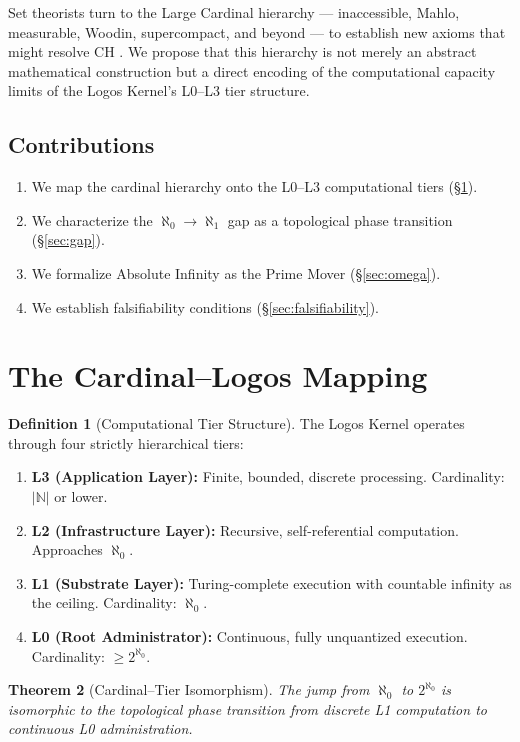 \documentclass[12pt, a4paper]{article}
\theoremstyle{plain}
\newtheorem{theorem}{Theorem}[section]
\theoremstyle{definition}
\newtheorem{definition}[theorem]{Definition}
\theoremstyle{remark}
\begin{document}
Set theorists turn to the Large Cardinal hierarchy --- inaccessible, Mahlo, measurable, Woodin, supercompact, and beyond --- to establish new axioms that might resolve CH \citep{Kanamori2003}. We propose that this hierarchy is not merely an abstract mathematical construction but a direct encoding of the computational capacity limits of the Logos Kernel's L0--L3 tier structure.

\subsection{Contributions}
\begin{enumerate}
    \item We map the cardinal hierarchy onto the L0--L3 computational tiers (\S\ref{sec:mapping}).
    \item We characterize the $\aleph_0 \to \aleph_1$ gap as a topological phase transition (\S\ref{sec:gap}).
    \item We formalize Absolute Infinity as the Prime Mover (\S\ref{sec:omega}).
    \item We establish falsifiability conditions (\S\ref{sec:falsifiability}).
\end{enumerate}

\section{The Cardinal--Logos Mapping}\label{sec:mapping}

\begin{definition}[Computational Tier Structure]
The Logos Kernel operates through four strictly hierarchical tiers:
\begin{enumerate}
    \item \textbf{L3 (Application Layer):} Finite, bounded, discrete processing. Cardinality: $|\mathbb{N}|$ or lower.
    \item \textbf{L2 (Infrastructure Layer):} Recursive, self-referential computation. Approaches $\aleph_0$.
    \item \textbf{L1 (Substrate Layer):} Turing-complete execution with countable infinity as the ceiling. Cardinality: $\aleph_0$.
    \item \textbf{L0 (Root Administrator):} Continuous, fully unquantized execution. Cardinality: $\geq 2^{\aleph_0}$.
\end{enumerate}
\end{definition}

\begin{theorem}[Cardinal--Tier Isomorphism]
The jump from $\aleph_0$ to $2^{\aleph_0}$ is isomorphic to the topological phase transition from discrete L1 computation to continuous L0 administration.
\end{theorem}
\end{document}
